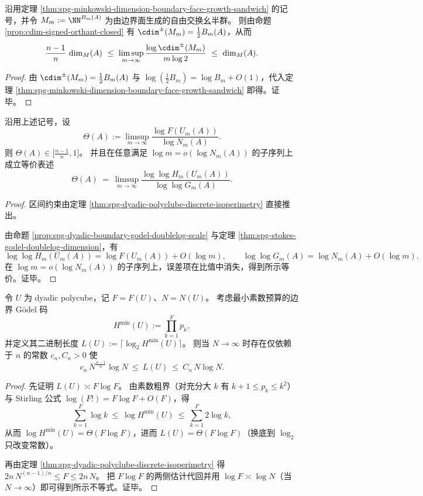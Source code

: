 \begin{corollary}[带符号圆维的边界增长率夹逼]\label{cor:spg-minkowski-dimension-boundary-cdimpm-growth-sandwich}
沿用定理 \ref{thm:spg-minkowski-dimension-boundary-face-growth-sandwich} 的记号，并令
\(
M_m:=\NN^{B_m(A)}
\)
为由边界面生成的自由交换幺半群。
则由命题 \ref{prop:cdim-signed-orthant-closed} 有 \(\cdim^{\pm}(M_m)=\frac12B_m(A)\)，从而
\[
\frac{n-1}{n}\,\dim_M(A)
\ \le\
\limsup_{m\to\infty}\frac{\log \cdim^{\pm}(M_m)}{m\log 2}
\ \le\
\dim_M(A).
\]
\end{corollary}
\begin{proof}
由 \(\cdim^{\pm}(M_m)=\frac12 B_m(A)\) 与 \(\log(\tfrac12 B_m)=\log B_m+O(1)\)，代入定理 \ref{thm:spg-minkowski-dimension-boundary-face-growth-sandwich} 即得。证毕。
\end{proof}

\begin{corollary}[边界主导指数的算术化读出]\label{cor:spg-boundary-dominance-exponent-arithmetized}
沿用上述记号，设
\[
\Theta(A):=\limsup_{m\to\infty}\frac{\log F(U_m(A))}{\log N_m(A)}.
\]
则 \(\Theta(A)\in\bigl[\frac{n-1}{n},1\bigr]\)。
并且在任意满足 \(\log m=o(\log N_m(A))\) 的子序列上成立等价表述
\[
\Theta(A)
\ =\
\limsup_{m\to\infty}\frac{\log\log H_m(U_m(A))}{\log\log G_m(A)}.
\]
\end{corollary}
\begin{proof}
区间约束由定理 \ref{thm:spg-dyadic-polyclube-discrete-isoperimetry} 直接推出。
\par
由命题 \ref{prop:spg-dyadic-boundary-godel-doublelog-scale} 与定理 \ref{thm:spg-stokes-godel-doublelog-dimension}，有
\[
\log\log H_m(U_m(A))=\log F(U_m(A))+O(\log m),
\qquad
\log\log G_m(A)=\log N_m(A)+O(\log m).
\]
在 \(\log m=o(\log N_m(A))\) 的子序列上，误差项在比值中消失，得到所示等价。证毕。
\end{proof}

\begin{theorem}[边界 Gödel 编码的比特复杂度等周下界]\label{thm:spg-boundary-godel-bitcomplexity-isoperimetric}
令 \(U\) 为 dyadic polycube，记 \(F=F(U)\)、\(N=N(U)\)。
考虑最小素数预算的边界 Gödel 码
\[
H^{\min}(U):=\prod_{k=1}^{F} p_k,
\]
并定义其二进制长度 \(L(U):=\lceil\log_2 H^{\min}(U)\rceil\)。
则当 \(N\to\infty\) 时存在仅依赖于 \(n\) 的常数 \(c_n,C_n>0\) 使
\[
c_n\,N^{\frac{n-1}{n}}\log N\ \le\ L(U)\ \le\ C_n\,N\log N.
\]
\end{theorem}
\begin{proof}
先证明 \(L(U)\asymp F\log F\)。
由素数粗界（对充分大 \(k\) 有 \(k+1\le p_k\le k^2\)）与 Stirling 公式 \(\log(F!)=F\log F+O(F)\)，得
\[
\sum_{k=1}^{F}\log k\ \le\ \log H^{\min}(U)\ \le\ \sum_{k=1}^{F}2\log k,
\]
从而 \(\log H^{\min}(U)=\Theta(F\log F)\)，进而 \(L(U)=\Theta(F\log F)\)（换底到 \(\log_2\) 只改变常数）。
\par
再由定理 \ref{thm:spg-dyadic-polyclube-discrete-isoperimetry} 得 \(2n\,N^{(n-1)/n}\le F\le 2n\,N\)。
把 \(F\log F\) 的两侧估计代回并用 \(\log F\asymp \log N\)（当 \(N\to\infty\)）即可得到所示不等式。证毕。
\end{proof}

